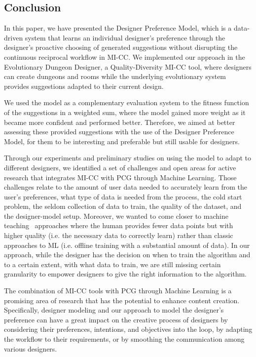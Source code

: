 \subsection{Conclusion}

In this paper, we have presented the Designer Preference Model, which is a data-driven system that learns an individual designer's preference through the designer’s proactive choosing of generated suggestions without disrupting the continuous reciprocal workflow in MI-CC. We implemented our approach in the Evolutionary Dungeon Designer, a Quality-Diversity MI-CC tool, where designers can create dungeons and rooms while the underlying evolutionary system provides suggestions adapted to their current design. 

We used the model as a complementary evaluation system to the fitness function of the suggestions in a weighted sum, where the model gained more weight as it became more confident and performed better. Therefore, we aimed at better assessing these provided suggestions with the use of the Designer Preference Model, for them to be interesting and preferable but still usable for designers.

Through our experiments and preliminary studies on using the model to adapt to different designers, we identified a set of challenges and open areas for active research that integrates MI-CC with PCG through Machine Learning. Those challenges relate to the amount of user data needed to accurately learn from the user's preferences, what type of data is needed from the process, the cold start problem, the seldom collection of data to train, the quality of the dataset, and the designer-model setup. Moreover, we wanted to come closer to machine teaching~ approaches where the human provides fewer data points but with higher quality (i.e. the necessary data to correctly learn) rather than classic approaches to ML (i.e. offline training with a substantial amount of data). In our approach, while the designer has the decision on when to train the algorithm and to a certain extent, with what data to train, we are still missing certain granularity to empower designers to give the right information to the algorithm.

The combination of MI-CC tools with PCG through Machine Learning is a promising area of research that has the potential to enhance content creation. Specifically, designer modeling and our approach to model the designer's preference can have a great impact on the creative process of designers by considering their preferences, intentions, and objectives into the loop, by adapting the workflow to their requirements, or by smoothing the communication among various designers.

